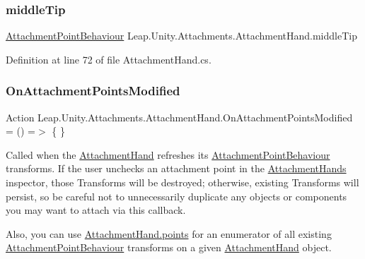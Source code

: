 \subsubsection{\texorpdfstring{middleTip}{middleTip}}
{\footnotesize\ttfamily \mbox{\hyperlink{class_leap_1_1_unity_1_1_attachments_1_1_attachment_point_behaviour}{Attachment\+Point\+Behaviour}} Leap.\+Unity.\+Attachments.\+Attachment\+Hand.\+middle\+Tip}



Definition at line 72 of file Attachment\+Hand.\+cs.

\mbox{\label{class_leap_1_1_unity_1_1_attachments_1_1_attachment_hand_a46767d010896459f352638e42c0bd5d1}} 
\subsubsection{\texorpdfstring{OnAttachmentPointsModified}{OnAttachmentPointsModified}}
{\footnotesize\ttfamily Action Leap.\+Unity.\+Attachments.\+Attachment\+Hand.\+On\+Attachment\+Points\+Modified = () =$>$ \{ \}}



Called when the \mbox{\hyperlink{class_leap_1_1_unity_1_1_attachments_1_1_attachment_hand}{Attachment\+Hand}} refreshes its \mbox{\hyperlink{class_leap_1_1_unity_1_1_attachments_1_1_attachment_point_behaviour}{Attachment\+Point\+Behaviour}} transforms. If the user unchecks an attachment point in the \mbox{\hyperlink{class_leap_1_1_unity_1_1_attachments_1_1_attachment_hands}{Attachment\+Hands}} inspector, those Transforms will be destroyed; otherwise, existing Transforms will persist, so be careful not to unnecessarily duplicate any objects or components you may want to attach via this callback. 

Also, you can use \mbox{\hyperlink{class_leap_1_1_unity_1_1_attachments_1_1_attachment_hand_aeb29b522823d247cf907a2488f1fbebf}{Attachment\+Hand.\+points}} for an enumerator of all existing \mbox{\hyperlink{class_leap_1_1_unity_1_1_attachments_1_1_attachment_point_behaviour}{Attachment\+Point\+Behaviour}} transforms on a given \mbox{\hyperlink{class_leap_1_1_unity_1_1_attachments_1_1_attachment_hand}{Attachment\+Hand}} object. 

